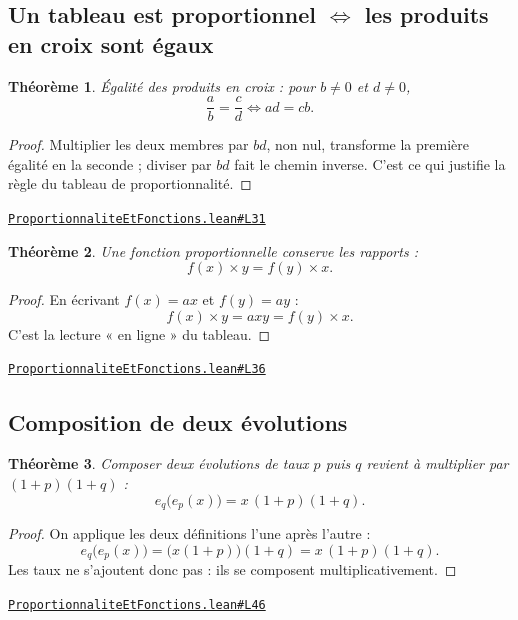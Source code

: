 \documentclass[11pt,a4paper]{article}
\theoremstyle{definition}
\theoremstyle{plain}
\newtheorem{theoreme}{Théorème}
\newcommand{\source}[2]{\par\smallskip\noindent\hfill{\footnotesize\href{#1}{\texttt{#2}}}\par\smallskip}
\begin{document}
\subsection{Un tableau est proportionnel \(\iff\) les produits en croix sont égaux}

\begin{theoreme}
Égalité des produits en croix : pour $b \ne 0$ et $d \ne 0$,
\[ \frac{a}{b} = \frac{c}{d} \iff ad = cb . \]
\end{theoreme}

\begin{proof}
Multiplier les deux membres par $bd$, non nul, transforme la première égalité en la
seconde ; diviser par $bd$ fait le chemin inverse. C'est ce qui justifie la règle du
tableau de proportionnalité.
\end{proof}
\source{https://github.com/Commutator-IO/learn-lean/blob/main/courses/01-college/05-proportionnalite-et-fonctions/ProportionnaliteEtFonctions.lean\#L31}{ProportionnaliteEtFonctions.lean\#L31}

\begin{theoreme}
Une fonction proportionnelle conserve les rapports :
\[ f(x) \times y = f(y) \times x . \]
\end{theoreme}

\begin{proof}
En écrivant $f(x) = ax$ et $f(y) = ay$ :
\[ f(x) \times y = axy = f(y) \times x . \]
C'est la lecture « en ligne » du tableau.
\end{proof}
\source{https://github.com/Commutator-IO/learn-lean/blob/main/courses/01-college/05-proportionnalite-et-fonctions/ProportionnaliteEtFonctions.lean\#L36}{ProportionnaliteEtFonctions.lean\#L36}

\subsection{Composition de deux évolutions}

\begin{theoreme}
Composer deux évolutions de taux $p$ puis $q$ revient à multiplier par $(1+p)(1+q)$ :
\[ e_q\bigl(e_p(x)\bigr) = x\,(1+p)(1+q) . \]
\end{theoreme}

\begin{proof}
On applique les deux définitions l'une après l'autre :
\[ e_q\bigl(e_p(x)\bigr) = \bigl(x(1+p)\bigr)(1+q) = x\,(1+p)(1+q) . \]
Les taux ne s'ajoutent donc pas : ils se composent multiplicativement.
\end{proof}
\source{https://github.com/Commutator-IO/learn-lean/blob/main/courses/01-college/05-proportionnalite-et-fonctions/ProportionnaliteEtFonctions.lean\#L46}{ProportionnaliteEtFonctions.lean\#L46}
\end{document}
